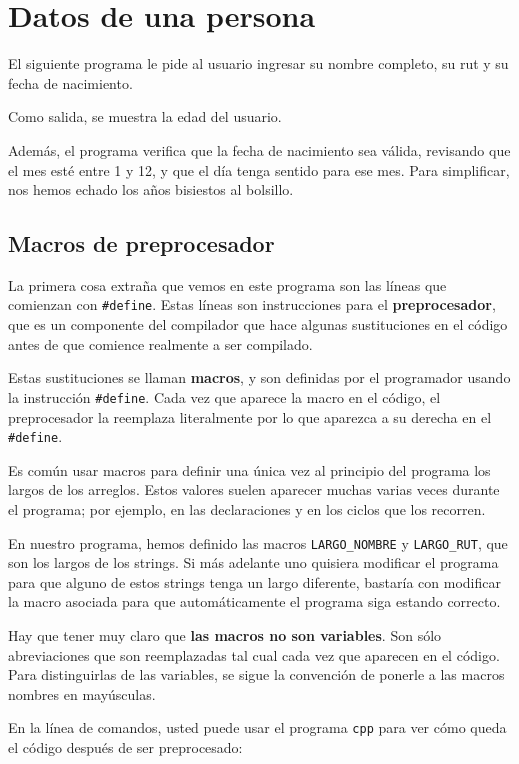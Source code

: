 \section{Datos de una persona}

El siguiente programa le pide al usuario ingresar su nombre completo, su
rut y su fecha de nacimiento.

Como salida, se muestra la edad del usuario.

Además, el programa verifica que la fecha de nacimiento sea válida,
revisando que el mes esté entre 1 y 12, y que el día tenga sentido para
ese mes. Para simplificar, nos hemos echado los años bisiestos al
bolsillo.

\subsection{Macros de preprocesador}

La primera cosa extraña que vemos en este programa son las líneas que
comienzan con \lstinline!#define!. Estas líneas son instrucciones para
el \textbf{preprocesador}, que es un componente del compilador que hace
algunas sustituciones en el código antes de que comience realmente a ser
compilado.

Estas sustituciones se llaman \textbf{macros}, y son definidas por el
programador usando la instrucción \lstinline!#define!. Cada vez que
aparece la macro en el código, el preprocesador la reemplaza
literalmente por lo que aparezca a su derecha en el \lstinline!#define!.

Es común usar macros para definir una única vez al principio del
programa los largos de los arreglos. Estos valores suelen aparecer
muchas varias veces durante el programa; por ejemplo, en las
declaraciones y en los ciclos que los recorren.

En nuestro programa, hemos definido las macros \lstinline!LARGO_NOMBRE!
y \lstinline!LARGO_RUT!, que son los largos de los strings. Si más
adelante uno quisiera modificar el programa para que alguno de estos
strings tenga un largo diferente, bastaría con modificar la macro
asociada para que automáticamente el programa siga estando correcto.

Hay que tener muy claro que \textbf{las macros no son variables}. Son
sólo abreviaciones que son reemplazadas tal cual cada vez que aparecen
en el código. Para distinguirlas de las variables, se sigue la
convención de ponerle a las macros nombres en mayúsculas.

En la línea de comandos, usted puede usar el programa \lstinline!cpp!
para ver cómo queda el código después de ser preprocesado:

